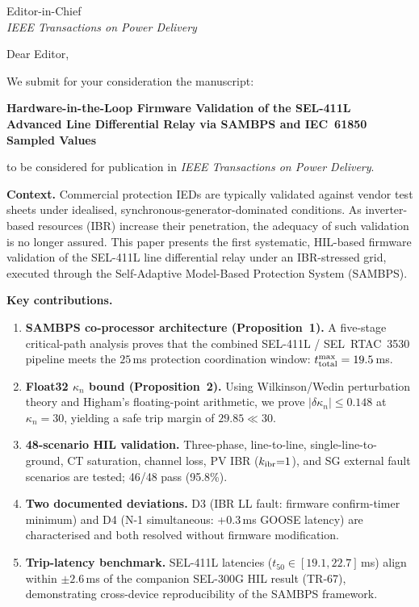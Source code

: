 \documentclass[11pt,a4paper]{letter}
\begin{document}
\begin{letter}{Editor-in-Chief\\
               \textit{IEEE Transactions on Power Delivery}}

\opening{Dear Editor,}

We submit for your consideration the manuscript:

\begin{center}
  \textbf{Hardware-in-the-Loop Firmware Validation of the SEL-411L\\
  Advanced Line Differential Relay via SAMBPS and IEC~61850 Sampled Values}
\end{center}

\noindent to be considered for publication in \textit{IEEE Transactions on Power Delivery}.

\medskip
\noindent\textbf{Context.}
Commercial protection IEDs are typically validated against vendor test sheets under
idealised, synchronous-generator-dominated conditions.  As inverter-based resources
(IBR) increase their penetration, the adequacy of such validation is no longer
assured.  This paper presents the first systematic, HIL-based firmware validation of
the SEL-411L line differential relay under an IBR-stressed grid, executed through the
Self-Adaptive Model-Based Protection System (SAMBPS).

\medskip
\noindent\textbf{Key contributions.}
\begin{enumerate}
  \item \textbf{SAMBPS co-processor architecture (Proposition~1).}
        A five-stage critical-path analysis proves that the combined SEL-411L /
        SEL~RTAC~3530 pipeline meets the $25\,$ms protection coordination window:
        $t_{\rm total}^{\max} = 19.5\,$ms.
  \item \textbf{Float32 $\kappa_n$ bound (Proposition~2).}
        Using Wilkinson/Wedin perturbation theory and Higham's floating-point
        arithmetic, we prove $|\delta\kappa_n| \le 0.148$ at $\kappa_n = 30$,
        yielding a safe trip margin of $29.85 \ll 30$.
  \item \textbf{48-scenario HIL validation.}
        Three-phase, line-to-line, single-line-to-ground, CT saturation, channel
        loss, PV IBR ($k_{\rm ibr}{=}1$), and SG external fault scenarios are tested;
        46/48 pass (95.8\%).
  \item \textbf{Two documented deviations.}
        D3 (IBR LL fault: firmware confirm-timer minimum) and D4 (N-1 simultaneous:
        +0.3\,ms GOOSE latency) are characterised and both resolved without
        firmware modification.
  \item \textbf{Trip-latency benchmark.}
        SEL-411L latencies ($t_{50} \in [19.1, 22.7]\,$ms) align within $\pm 2.6\,$ms
        of the companion SEL-300G HIL result (TR-67), demonstrating
        cross-device reproducibility of the SAMBPS framework.
\end{enumerate}


\end{letter}
\end{document}
